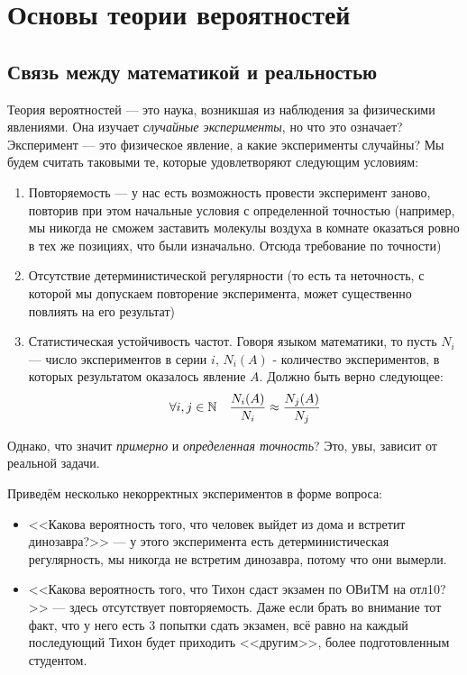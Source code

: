 \section{Основы теории вероятностей}

\subsection{Связь между математикой и реальностью}

\begin{note}
	Теория вероятностей --- это наука, возникшая из наблюдения за физическими явлениями. Она изучает \textit{случайные эксперименты}, но что это означает? Эксперимент --- это физическое явление, а какие эксперименты случайны? Мы будем считать таковыми те, которые удовлетворяют следующим условиям:
	\begin{enumerate}
		\item Повторяемость --- у нас есть возможность провести эксперимент заново, повторив при этом начальные условия с определенной точностью (например, мы никогда не сможем заставить молекулы воздуха в комнате оказаться ровно в тех же позициях, что были изначально. Отсюда требование по точности) 
		
		\item Отсутствие детерминистической регулярности (то есть та неточность, с которой мы допускаем повторение эксперимента, может существенно повлиять на его результат)
		
		\item Статистическая устойчивость частот. Говоря языком математики, то пусть $N_i$ --- число экспериментов в серии $i$, $N_i(A)$ - количество экспериментов, в которых результатом оказалось явление $A$. Должно быть верно следующее:
		\[
			\forall i, j \in \mathbb{N} \quad \frac{N_i(A)}{N_i} \approx \frac{N_j(A)}{N_j} 
		\]
	\end{enumerate}
	Однако, что значит \textit{примерно} и \textit{определенная точность}? Это, увы, зависит от реальной задачи.
\end{note}

\begin{example}
	Приведём несколько некорректных экспериментов в форме вопроса:
	\begin{itemize}
		\item <<Какова вероятность того, что человек выйдет из дома и встретит динозавра?>> --- у этого эксперимента есть детерминистическая регулярность, мы никогда не встретим динозавра, потому что они вымерли.
		
		\item <<Какова вероятность того, что Тихон сдаст экзамен по ОВиТМ на отл10?>> --- здесь отсутствует повторяемость. Даже если брать во внимание тот факт, что у него есть 3 попытки сдать экзамен, всё равно на каждый последующий Тихон будет приходить <<другим>>, более подготовленным студентом.
	\end{itemize}
\end{example}

